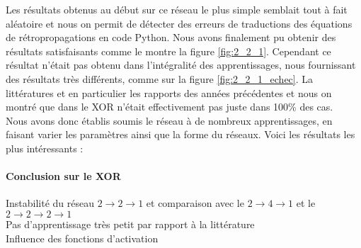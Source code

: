 Les résultats obtenus au début sur ce réseau le plus simple semblait tout à fait aléatoire et nous on permit de détecter des erreurs de traductions des équations de rétropropagations en code Python. Nous avons finalement pu obtenir des résultats satisfaisants comme le montre la figure \ref{fig:2_2_1}. Cependant ce résultat n'était pas obtenu dans l'intégralité des apprentissages, nous fournissant des résultats très différents, comme sur la figure \ref{fig:2_2_1_echec}. La littératures et en particulier les rapports des années précédentes \cite{appartement} et \cite{Pinaple} nous on montré que dans le XOR n'était effectivement pas juste dans 100\% des cas.\\
Nous avons donc établis soumis le réseau à de nombreux apprentissages, en faisant varier les paramètres ainsi que la forme du réseaux. Voici les résultats les plus intéressants :


\paragraph{Conclusion sur le XOR} %
\label{par:conclusion_sur_le_xor}
Instabilité du réseau $2\rightarrow2\rightarrow1$ et comparaison avec le $ 2 \rightarrow 4 \rightarrow 1 $ et le $2 \rightarrow 2 \rightarrow 2 \rightarrow 1 $ \\
Pas d'apprentissage très petit par rapport à la littérature\\
Influence des fonctions d'activation






